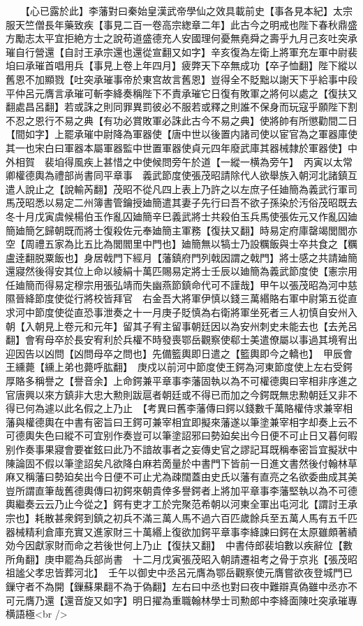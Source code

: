 　　【心已露於此】李藩對曰秦始皇漢武帝學仙之效具載前史【事各見本紀】太宗服天竺僧長年藥致疾【事見二百一卷高宗緫章二年】此古今之明戒也陛下春秋鼎盛方勵志太平宜拒絶方士之說苟道盛德充人安國理何憂無堯舜之壽乎九月己亥吐突承璀自行營還【自討王承宗還也還從宣翻又如字】辛亥復為左衛上將軍充左軍中尉裴垍曰承璀首唱用兵【事見上卷上年四月】疲弊天下卒無成功【卒子恤翻】陛下縱以舊恩不加顯戮【吐突承璀事帝於東宫故言舊恩】豈得全不貶黜以謝天下乎給事中段平仲呂元膺言承璀可斬李絳奏稱陛下不責承璀它日復有敗軍之將何以處之【復扶又翻處昌呂翻】若或誅之則同罪異罰彼必不服若或釋之則誰不保身而玩寇乎願陛下割不忍之恩行不易之典【有功必賞敗軍必誅此古今不易之典】使將帥有所懲勸間二日【間如字】上罷承璀中尉降為軍器使【唐中世以後置内諸司使以宦官為之軍器庫使其一也宋白曰軍器本屬軍器監中世置軍器使貞元四年廢武庫其器械隸於軍器使】中外相賀　裴垍得風疾上甚惜之中使候問旁午於道【一縱一横為旁午】　丙寅以太常卿權德輿為禮部尚書同平章事　義武節度使張茂昭請除代人欲舉族入朝河北諸鎮互遣人說止之【說輸芮翻】茂昭不從凡四上表上乃許之以左庶子任廸簡為義武行軍司馬茂昭悉以易定二州簿書管鑰授廸簡遣其妻子先行曰吾不欲子孫染於汚俗茂昭既去冬十月戊寅虞候楊伯玉作亂囚廸簡辛巳義武將士共殺伯玉兵馬使張佐元又作亂囚廸簡廸簡乞歸朝既而將士復殺佐元奉廸簡主軍務【復扶又翻】時易定府庫罄竭閭閻亦空【周禮五家為比五比為閭閻里中門也】廸簡無以犒士乃設糲飯與士卒共食之【糲盧逹翻脱粟飯也】身居戟門下經月【藩鎮府門列戟因謂之戟門】將士感之共請廸簡還寢然後得安其位上命以綾絹十萬匹賜易定將士壬辰以廸簡為義武節度使【憲宗用任廸簡而得易定穆宗用張弘靖而失幽燕節鎮命代可不謹哉】甲午以張茂昭為河中慈隰晉絳節度使從行將校皆拜官　右金吾大將軍伊慎以錢三萬緡賂右軍中尉第五從直求河中節度使從直恐事泄奏之十一月庚子貶慎為右衛將軍坐死者三人初慎自安州入朝【入朝見上卷元和元年】留其子宥主留事朝廷因以為安州刺史未能去也【去羌呂翻】會宥母卒於長安宥利於兵權不時發喪鄂岳觀察使郗士美遣僚屬以事過其境宥出迎因告以凶問【凶問母卒之問也】先備籃輿即日遣之【籃輿即今之轎也】　甲辰會王纁薨【纁上弟也薨呼肱翻】　庚戍以前河中節度使王鍔為河東節度使上左右受鍔厚賂多稱譽之【譽音余】上命鍔兼平章事李藩固執以為不可權德輿曰宰相非序進之官唐興以來方鎮非大忠大勲則跋扈者朝廷或不得已而加之今鍔既無忠勲朝廷又非不得已何為遽以此名假之上乃止　【考異曰舊李藩傳曰鍔以錢數千萬賂權侍求兼宰相藩與權德輿在中書有密旨曰王鍔可兼宰相宜即擬來藩遂以筆塗兼宰相字却奏上云不可德輿失色曰縱不可宜别作奏豈可以筆塗詔邪曰勢廹矣出今日便不可止日又暮何暇别作奏事果寢會要崔鉉曰此乃不諳故事者之妄傳史官之謬記耳既稱奉密旨宜擬狀中陳論固不假以筆塗詔矣凡欲降白麻若啇量於中書門下皆前一日進文書然後付翰林草麻又稱藩曰勢廹矣出今日便不可止尤為疎闊蓋由史氏以藩有直亮之名欲委曲成其美豈所謂直筆哉舊德輿傳曰初鍔來朝貴倖多譽鍔者上將加平章事李藩堅執以為不可德輿繼奏云云乃止今從之】鍔有吏才工於完聚范希朝以河東全軍出屯河北【謂討王承宗也】耗散甚衆鍔到鎮之初兵不滿三萬人馬不過六百匹歲餘兵至五萬人馬有五千匹器械精利倉庫充實又進家財三十萬緡上復欲加鍔平章事李絳諫曰鍔在太原雖頗著績効今因獻家財而命之若後世何上乃止【復扶又翻】　中書侍郎裴垍數以疾辭位【數所角翻】庚申罷為兵部尚書　十二月戊寅張茂昭入朝請遷祖考之骨于京兆【張茂昭祖謐父孝忠皆葬河北】　壬午以御史中丞呂元膺為鄂岳觀察使元膺嘗欲夜登城門已鏁守者不為開【鏁蘇果翻不為于偽翻】左右曰中丞也對曰夜中難辯真偽雖中丞亦不可元膺乃還【還音旋又如字】明日擢為重職翰林學士司勲郎中李絳面陳吐突承璀專横語極<br />
